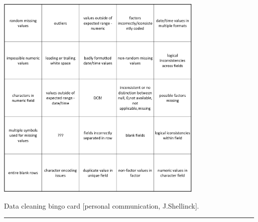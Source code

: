 \begin{table}[!t]
\centering
\includegraphics[width=0.75\textwidth]{Images/bingo.png}
\caption{\small Data cleaning bingo card [personal communication, J.Shellinck].} \label{fig:bingo}\hrule
\end{table}
